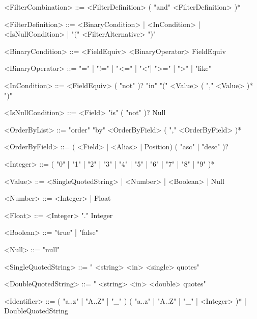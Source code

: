 \begin{grammar}
    <FilterCombination> ::= <FilterDefinition> ( "and" <FilterDefinition> )*

    <FilterDefinition> ::= <BinaryCondition> | <InCondition> | <IsNullCondition> | "(" <FilterAlternative> ")"

    <BinaryCondition> ::= <FieldEquiv>  <BinaryOperator> FieldEquiv

    <BinaryOperator> ::= "=" | "!=" | "<=" | "<"| ">=" | ">" | "like"

    <InCondition> ::= <FieldEquiv> ( "not" )? "in" "(" <Value> ( "," <Value> )* ")"

    <IsNullCondition> ::= <Field> "is" ( "not" )? Null

    <OrderByList> ::= "order" "by" <OrderByField> ( "," <OrderByField> )*

    <OrderByField> ::= ( <Field> | <Alias> | Position) ( "asc" | "desc" )?

    <Integer> ::= ( "0" | "1" | "2" | "3" | "4" | "5" | "6" | "7" | "8" | "9" )*

    <Value> ::= <SingleQuotedString> | <Number> | <Boolean> | Null

    <Number> ::= <Integer> | Float

    <Float> ::= <Integer> "." Integer

    <Boolean> ::= "true" | "false"

    <Null> ::= "null"

    <SingleQuotedString> ::= " <string>  <in>  <single> quotes"

    <DoubleQuotedString> ::= " <string>  <in>  <double> quotes"

    <Identifier> ::= ( "a..z" | "A..Z" | "_" ) ( "a..z" | "A..Z" | "_" | <Integer> )* | DoubleQuotedString

\end{grammar}
